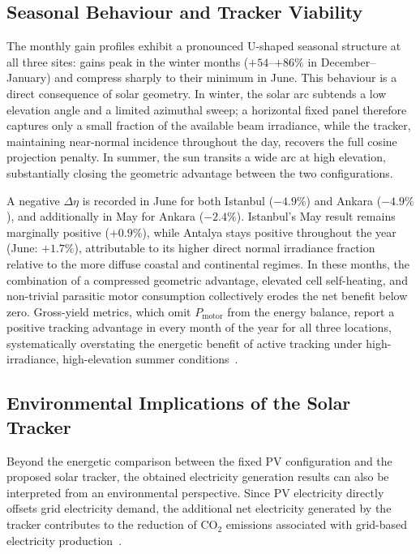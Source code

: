 \documentclass[preprint,3p,12pt]{elsarticle}
\begin{document}
\subsection{Seasonal Behaviour and Tracker Viability}
\label{sec:results_seasonal}

The monthly gain profiles exhibit a pronounced U-shaped seasonal
structure at all three sites: gains peak in the winter months
($+54$--$+86\%$ in December--January) and compress sharply to their
minimum in June. This behaviour is a direct consequence of solar
geometry. In winter, the solar arc subtends a low elevation angle
and a limited azimuthal sweep; a horizontal fixed panel therefore
captures only a small fraction of the available beam irradiance,
while the tracker, maintaining near-normal incidence throughout
the day, recovers the full cosine projection penalty. In summer,
the sun transits a wide arc at high elevation, substantially
closing the geometric advantage between the two configurations.

A negative $\Delta\eta$ is recorded in June for both Istanbul
($-4.9\%$) and Ankara ($-4.9\%$), and additionally in May for
Ankara ($-2.4\%$). Istanbul's May result remains marginally
positive ($+0.9\%$), while Antalya stays positive throughout the
year (June: $+1.7\%$), attributable to its higher direct normal
irradiance fraction relative to the more diffuse coastal and
continental regimes. In these months, the combination of a
compressed geometric advantage, elevated cell self-heating, and
non-trivial parasitic motor consumption collectively erodes the
net benefit below zero. Gross-yield metrics, which omit
$P_{\mathrm{motor}}$ from the energy balance, report a positive
tracking advantage in every month of the year for all three
locations, systematically overstating the energetic benefit of
active tracking under high-irradiance, high-elevation summer
conditions~\cite{Tan2021}.

\subsection{Environmental Implications of the Solar Tracker}
\label{sec:environmental}

Beyond the energetic comparison between the fixed PV configuration
and the proposed solar tracker, the obtained electricity generation
results can also be interpreted from an environmental perspective.
Since PV electricity directly offsets grid electricity demand, the
additional net electricity generated by the tracker contributes to
the reduction of CO$_2$ emissions associated with grid-based
electricity production~\cite{Parlak2024}.
\end{document}
